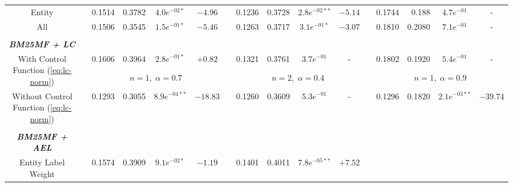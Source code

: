 \begin{table*}
{\begin{tabular}{cc@{\hs}rrccc@{\hs}rrccc@{\hs}rrcc}
{\raggedright Entity} & \phantom{a} & 0.1514 & 0.3782 & $4.0e^{-02*}$ & $-4.96$
                      & \phantom{a} & 0.1236 & 0.3728 & $2.8e^{-02**}$ & $-5.14$
                      & \phantom{a} & 0.1744 & 0.188 & $4.7e^{-01}$ & - \\
{\raggedright All} & \phantom{a} & 0.1506 & 0.3545 & $1.5e^{-01*}$ & $-5.46$
                   & \phantom{a} & 0.1263 & 0.3717 & $3.1e^{-01*}$ & $-3.07$
                   & \phantom{a} & 0.1810 & 0.2080 & $7.1e^{-01}$ & - \\
\\
\emph{\textbf{BM25MF + LC}} & \multicolumn{15}{c}{\phantom{a}} \\
\multirow{2}{*}{{\raggedright With Control Function (\ref{eq:lc-norm})}} & \phantom{a} & 0.1606 & 0.3964 & $2.8e^{-01*}$ & $+0.82$
                                                                 & \phantom{a} & 0.1321 & 0.3761 & $3.7e^{-01}$ & -
                                                                 & \phantom{a} & 0.1802 & 0.1920 & $5.4e^{-01}$ & - \\
 & \phantom{a} & \multicolumn{4}{c}{$n=1,\;\alpha=0.7$}
   & \phantom{a} & \multicolumn{4}{c}{$n=2,\;\alpha=0.4$}
   & \phantom{a} & \multicolumn{4}{c}{$n=1,\;\alpha=0.9$} \\
{\raggedright Without Control Function (\ref{eq:lc-norm})} & \phantom{a} & 0.1293 & 0.3055 & $8.9e^{-04**}$ & $-18.83$
                                                   & \phantom{a} & 0.1260 & 0.3609 & $5.3e^{-01}$ & -
                                                   & \phantom{a} & 0.1296 & 0.1820 & $2.1e^{-03**}$ & $-39.74$ \\
\\
\emph{\textbf{BM25MF + AEL}} & \multicolumn{15}{c}{\phantom{a}} \\
{\raggedright Entity Label Weight} & \phantom{a} & 0.1574 & 0.3909 & $9.1e^{-02*}$ & $-1.19$
                                   & \phantom{a} & 0.1401 & 0.4011 & $7.8e^{-05**}$ & $+7.52$

\end{tabular}}
\end{table*}
